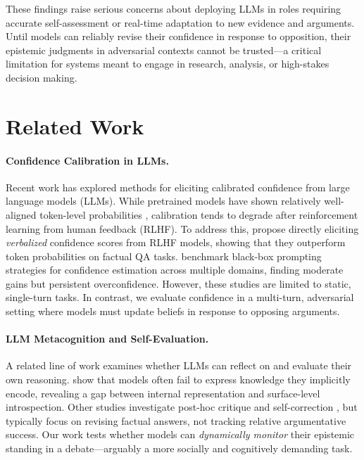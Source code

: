 \documentclass[11pt]{article}
\begin{document}
These findings raise serious concerns about deploying LLMs in roles requiring accurate self-assessment or real-time adaptation to new evidence and arguments. Until models can reliably revise their confidence in response to opposition, their epistemic judgments in adversarial contexts cannot be trusted—a critical limitation for systems meant to engage in research, analysis, or high-stakes decision making.


\section{Related Work}

\paragraph{Confidence Calibration in LLMs.}
Recent work has explored methods for eliciting calibrated confidence from large language models (LLMs). While pretrained models have shown relatively well-aligned token-level probabilities \citep{kadavath2022know}, calibration tends to degrade after reinforcement learning from human feedback (RLHF). To address this, \citet{tian2023justask} propose directly eliciting \textit{verbalized} confidence scores from RLHF models, showing that they outperform token probabilities on factual QA tasks. \citet{xiong2024uncertainty} benchmark black-box prompting strategies for confidence estimation across multiple domains, finding moderate gains but persistent overconfidence. However, these studies are limited to static, single-turn tasks. In contrast, we evaluate confidence in a multi-turn, adversarial setting where models must update beliefs in response to opposing arguments.

\paragraph{LLM Metacognition and Self-Evaluation.}
A related line of work examines whether LLMs can reflect on and evaluate their own reasoning. \citet{song2025introspect} show that models often fail to express knowledge they implicitly encode, revealing a gap between internal representation and surface-level introspection. Other studies investigate post-hoc critique and self-correction \citep{zhao2023selfeval, chiang2023evaluation}, but typically focus on revising factual answers, not tracking relative argumentative success. Our work tests whether models can \textit{dynamically monitor} their epistemic standing in a debate—arguably a more socially and cognitively demanding task.
\end{document}

